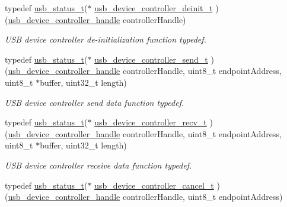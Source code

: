 \begin{DoxyCompactItemize}
typedef \hyperlink{group__usb__drv_ga3172b9f50553fb6d8aa2823d10a39c58}{usb\-\_\-status\-\_\-t}($\ast$ \hyperlink{group__usb__device__controller__driver_ga283139f5df38421250c30a094f34088d}{usb\-\_\-device\-\_\-controller\-\_\-deinit\-\_\-t} )(\hyperlink{group__usb__device__controller__driver_gaec03ce2e4732aa876cd2a91cf8e93b5b}{usb\-\_\-device\-\_\-controller\-\_\-handle} controller\-Handle)
\begin{DoxyCompactList}\small\item\em U\-S\-B device controller de-\/initialization function typedef. \end{DoxyCompactList}\item 
typedef \hyperlink{group__usb__drv_ga3172b9f50553fb6d8aa2823d10a39c58}{usb\-\_\-status\-\_\-t}($\ast$ \hyperlink{group__usb__device__controller__driver_ga5879c987e628c5c5a27b5fcc685e90c8}{usb\-\_\-device\-\_\-controller\-\_\-send\-\_\-t} )(\hyperlink{group__usb__device__controller__driver_gaec03ce2e4732aa876cd2a91cf8e93b5b}{usb\-\_\-device\-\_\-controller\-\_\-handle} controller\-Handle, uint8\-\_\-t endpoint\-Address, uint8\-\_\-t $\ast$buffer, uint32\-\_\-t length)
\begin{DoxyCompactList}\small\item\em U\-S\-B device controller send data function typedef. \end{DoxyCompactList}\item 
typedef \hyperlink{group__usb__drv_ga3172b9f50553fb6d8aa2823d10a39c58}{usb\-\_\-status\-\_\-t}($\ast$ \hyperlink{group__usb__device__controller__driver_gac14df7129a0dc5e7c0b7148b05992dc8}{usb\-\_\-device\-\_\-controller\-\_\-recv\-\_\-t} )(\hyperlink{group__usb__device__controller__driver_gaec03ce2e4732aa876cd2a91cf8e93b5b}{usb\-\_\-device\-\_\-controller\-\_\-handle} controller\-Handle, uint8\-\_\-t endpoint\-Address, uint8\-\_\-t $\ast$buffer, uint32\-\_\-t length)
\begin{DoxyCompactList}\small\item\em U\-S\-B device controller receive data function typedef. \end{DoxyCompactList}\item 
typedef \hyperlink{group__usb__drv_ga3172b9f50553fb6d8aa2823d10a39c58}{usb\-\_\-status\-\_\-t}($\ast$ \hyperlink{group__usb__device__controller__driver_ga476c2b07d6a5e467e104568aad59ef44}{usb\-\_\-device\-\_\-controller\-\_\-cancel\-\_\-t} )(\hyperlink{group__usb__device__controller__driver_gaec03ce2e4732aa876cd2a91cf8e93b5b}{usb\-\_\-device\-\_\-controller\-\_\-handle} controller\-Handle, uint8\-\_\-t endpoint\-Address)

\end{DoxyCompactItemize}
